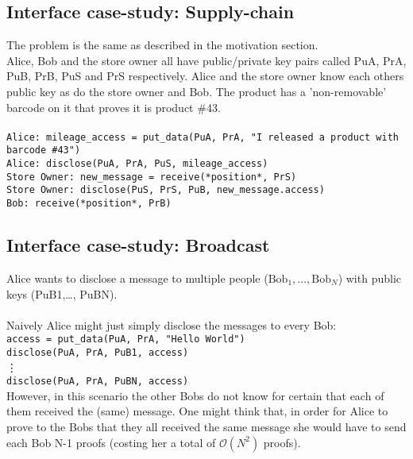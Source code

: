\documentclass[a4paper]{article} %
\begin{document}
\subsection{Interface case-study: Supply-chain}
The problem is the same as described in the motivation section.\\
Alice, Bob and the store owner all have public/private key pairs called PuA, PrA, PuB, PrB, PuS and PrS respectively. Alice and the store owner know each others public key as do the store owner and Bob. The product has a 'non-removable' barcode on it that proves it is product \#43. \\
\\ 
\lstinline{Alice: mileage_access = put_data(PuA, PrA, "I released a product with barcode #43")}\\
\lstinline{Alice: disclose(PuA, PrA, PuS, mileage_access)}\\
\lstinline{Store Owner: new_message = receive(*position*, PrS)}\\
\lstinline{Store Owner: disclose(PuS, PrS, PuB, new_message.access)}\\
\lstinline{Bob: receive(*position*, PrB)}\\

\subsection{Interface case-study: Broadcast}
Alice wants to disclose a message to multiple people ($\text{Bob}_1, \ldots, \text{Bob}_N$) with public keys (PuB1,\ldots, PuBN).\\
\\Naively Alice might just simply disclose the messages to every Bob:\\
\lstinline{access = put_data(PuA, PrA, "Hello World")}\\
\lstinline{disclose(PuA, PrA, PuB1, access)} \\
\vdots\\
\lstinline{disclose(PuA, PrA, PuBN, access)} \\

However, in this scenario the other Bobs do not know for certain that each of them received the (same) message. One might think that, in order for Alice to prove to the Bobs that they all received the same message she would have to send each Bob N-1 proofs (costing her a total of $\mathcal{O}(N^2)$ proofs).\\
\end{document}
